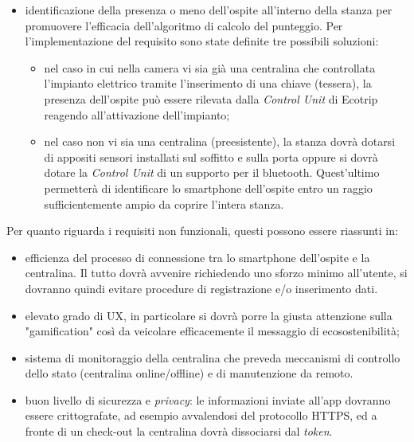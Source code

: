 \begin{itemize}
    \item identificazione della presenza o meno dell'ospite all'interno della stanza per promuovere l'efficacia dell'algoritmo di calcolo del punteggio. Per l'implementazione del requisito sono state definite tre possibili soluzioni:
    \begin{itemize}
        \item nel caso in cui nella camera vi sia già una centralina che controllata l'impianto elettrico tramite l'inserimento di una chiave (tessera), la presenza dell'ospite può essere rilevata dalla \textit{Control Unit} di Ecotrip reagendo all'attivazione dell'impianto;
        \item nel caso non vi sia una centralina (preesistente), la stanza dovrà dotarsi di appositi sensori installati sul soffitto e sulla porta oppure si dovrà dotare la \textit{Control Unit} di un supporto per il bluetooth. Quest'ultimo permetterà di identificare lo smartphone dell'ospite entro un raggio sufficientemente ampio da coprire l'intera stanza.
    \end{itemize}
\end{itemize}
%
Per quanto riguarda i requisiti non funzionali, questi possono essere riassunti in:
\begin{itemize}
    \item efficienza del processo di connessione tra lo smartphone dell'ospite e la centralina. Il tutto dovrà avvenire richiedendo uno sforzo minimo all'utente, si dovranno quindi evitare procedure di registrazione e/o inserimento dati. 
    \item elevato grado di UX, in particolare si dovrà porre la giusta attenzione sulla "gamification" così da veicolare efficacemente il messaggio di ecosostenibilità;
    \item sistema di monitoraggio della centralina che preveda meccanismi di controllo dello stato (centralina online/offline) e di manutenzione da remoto.
    \item buon livello di sicurezza e \textit{privacy}: le informazioni inviate all'app dovranno essere crittografate, ad esempio avvalendosi del protocollo HTTPS, ed a fronte di un check-out la centralina dovrà dissociarsi dal \textit{token}.
\end{itemize}
%
